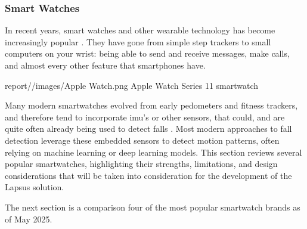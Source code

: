 \subsubsection{Smart Watches}
In recent years, smart watches and other wearable technology has become increasingly popular \cite{noauthor_wearables_nodate}. They have gone from simple step trackers to small computers on your wrist: being able to send and receive messages, make calls, and almost every other feature that smartphones have. 


    {report//images/Apple Watch.png}
    {Apple Watch Series 11}
    {smartwatch}

Many modern smartwatches evolved from early pedometers and fitness trackers, and therefore tend to incorporate \gls{imu}'s or other sensors, that could, and are quite often already being used to detect falls \cite{noauthor_get_nodate, apple_watch_fall_detection, noauthor_samsung_nodate}. Most modern approaches to fall detection leverage these embedded sensors to detect motion patterns, often relying on machine learning or deep learning models. This section reviews several popular smartwatches, highlighting their strengths, limitations, and design considerations that will be taken into consideration for the development of the Lapsus solution. 



The next section is a comparison four of the most popular smartwatch brands \cite{statista_smartwatches} as of May 2025.

